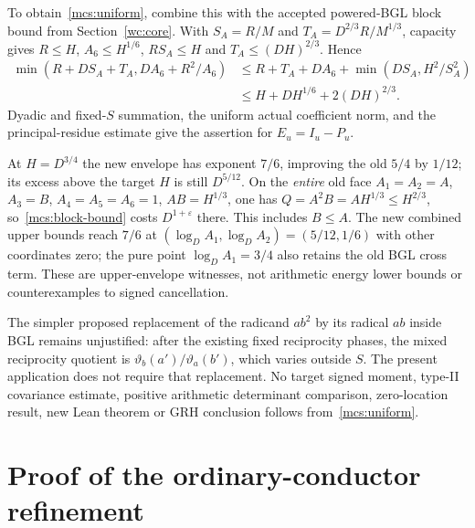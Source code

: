 \documentclass[11pt,oneside,openany]{book}
\theoremstyle{definition}\newtheorem{definition}[theorem]{Definition}
\theoremstyle{remark}\newtheorem{remark}[theorem]{Remark}
\begin{document}
To obtain~\eqref{mcs:uniform}, combine this with the accepted powered-BGL
block bound from Section~\ref{wc:core}. With
$S_A=R/M$ and $T_A=D^{2/3}R/M^{1/3}$, capacity gives
$R\le H$, $A_6\le H^{1/6}$, $RS_A\le H$ and
$T_A\le(DH)^{2/3}$. Hence
\begin{align*}
 \min(R+DS_A+T_A,DA_6+R^2/A_6)
 &\le R+T_A+DA_6+\min(DS_A,H^2/S_A^2)\\
 &\le H+DH^{1/6}+2(DH)^{2/3}.
\end{align*}
Dyadic and fixed-$S$ summation, the uniform actual coefficient norm,
and the principal-residue estimate give the assertion for $E_u=I_u-P_u$.

At $H=D^{3/4}$ the new envelope has exponent $7/6$, improving the old
$5/4$ by $1/12$; its excess above the target $H$ is still $D^{5/12}$.
On the \emph{entire} old face $A_1=A_2=A$, $A_3=B$,
$A_4=A_5=A_6=1$, $AB=H^{1/3}$, one has
$Q=A^2B=AH^{1/3}\le H^{2/3}$, so~\eqref{mcs:block-bound} costs
$D^{1+\varepsilon}$ there. This includes $B\le A$.
The new combined upper bounds reach $7/6$ at
$(\log_D A_1,\log_D A_2)=(5/12,1/6)$ with other coordinates zero;
the pure point $\log_D A_1=3/4$ also retains the old BGL cross term.
These are upper-envelope witnesses, not arithmetic energy lower bounds
or counterexamples to signed cancellation.

The simpler proposed replacement of the radicand $ab^2$ by its radical
$ab$ inside BGL remains unjustified: after the existing fixed reciprocity
phases, the mixed reciprocity quotient is
$\vartheta_b(a')/\vartheta_a(b')$, which varies outside $S$.
The present application does not require that replacement.
No target signed moment, type-II covariance estimate, positive arithmetic
determinant comparison, zero-location result, new Lean theorem or GRH
conclusion follows from~\eqref{mcs:uniform}.

\section{Proof of the ordinary-conductor refinement}\label{mcs:details}
\end{document}
